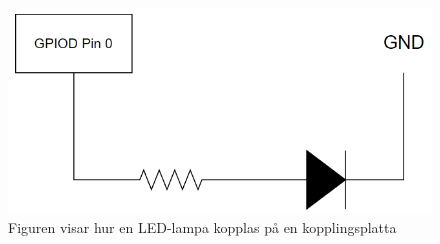 \documentclass{article}
\begin{document}
\begin{figure}[h]
    \centering
    \includegraphics[scale=0.5]{Projektrapport/LED.png}
    \caption {Figuren visar hur en LED-lampa kopplas på en kopplingsplatta}
    \label{fig:drawing}
\end{figure}
\end{document}
